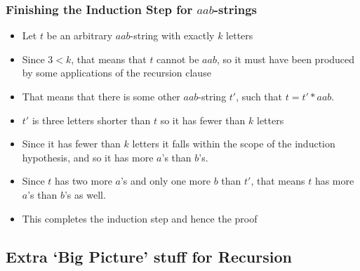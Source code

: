 \begin{frame}
\frametitle{Finishing the Induction Step for $aab$-strings}

\begin{itemize}[<+->]

\item Let $t$ be an arbitrary $aab$-string with exactly $k$ letters


\bi

\item Since $3<k$, that means that $t$ cannot be $aab$, so it must have been produced by some applications of the recursion clause

\item That means that there is some other $aab$-string $t'$, such that $t = t'* aab$.

\ei

\medskip

\item $t'$ is three letters shorter than $t$ so it has fewer than $k$ letters

\bi

\item Since it has fewer than $k$ letters it falls within the scope of the induction hypothesis, and so it has more $a$'s than $b$'s.

\item Since $t$ has two more $a$'s and only one more $b$ than $t'$, that means $t$ has more $a$'s than $b$'s as well.

\ei 

\medskip

\item This completes the induction step and hence the proof

\end{itemize} 
\end{frame}




\subsection{Extra `Big Picture' stuff for Recursion}

